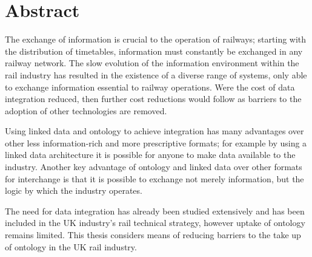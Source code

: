 \begingroup
\let\clearpage\relax
\let\cleardoublepage\relax
\let\cleardoublepage\relax

\chapter*{Abstract}
The exchange of information is crucial to the operation of railways; starting with the distribution of timetables, information must constantly be exchanged in any railway network. The slow evolution of the information environment within the rail industry has resulted in the existence of a diverse range of systems, only able to exchange information essential to railway operations. Were the cost of data integration reduced, then further cost reductions would follow as barriers to the adoption of other technologies are removed. 

Using linked data and ontology to achieve integration has many advantages over other less information-rich and more prescriptive formats; for example by using a linked data architecture it is possible for anyone to make data available to the industry. Another key advantage of ontology and linked data over other formats for interchange is that it is possible to exchange not merely information, but the logic by which the industry operates. 

The need for data integration has already been studied extensively and has been included in the UK industry's rail technical strategy, however uptake of ontology remains limited. This thesis considers means of reducing barriers to the take up of ontology in the UK rail industry.

\endgroup			

\vfill